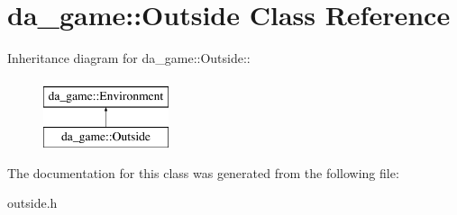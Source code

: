 \hypertarget{classda__game_1_1Outside}{
\section{da\_\-game::Outside Class Reference}
\label{classda__game_1_1Outside}
}
Inheritance diagram for da\_\-game::Outside::\begin{figure}[H]
\begin{center}
\leavevmode
\includegraphics[height=2cm]{classda__game_1_1Outside}
\end{center}
\end{figure}


The documentation for this class was generated from the following file:\begin{DoxyCompactItemize}
\item 
outside.h\end{DoxyCompactItemize}
